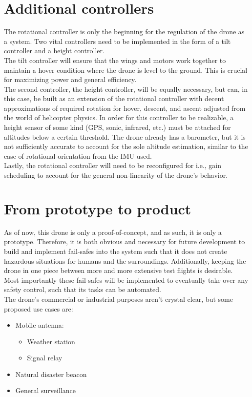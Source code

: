 \section{Additional controllers}
The rotational controller is only the beginning for the regulation of the drone as a system. Two vital controllers need to be implemented in the form of a tilt controller and a height controller. \\
The tilt controller will ensure that the wings and motors work together to maintain a hover condition where the drone is level to the ground. This is crucial for maximizing power and general efficiency.\\
The second controller, the height controller, will be equally necessary, but can, in this case, be built as an extension of the rotational controller with decent approximations of required rotation for hover, descent, and ascent adjusted from the world of helicopter physics. In order for this controller to be realizable, a height sensor of some kind (GPS, sonic, infrared, etc.) must be attached for altitudes below a certain threshold. The drone already has a barometer, but it is not sufficiently accurate to account for the sole altitude estimation, similar to the case of rotational orientation from the IMU used. \\
Lastly, the rotational controller will need to be reconfigured for i.e., gain scheduling to account for the general non-linearity of the drone's behavior. 

\section{From prototype to product}
As of now, this drone is only a proof-of-concept, and as such, it is only a prototype. Therefore, it is both obvious and necessary for future development to build and implement fail-safes into the system such that it does not create hazardous situations for humans and the surroundings. Additionally, keeping the drone in one piece between more and more extensive test flights is desirable. \\
Most importantly these fail-safes will be implemented to eventually take over any safety control, such that its tasks can be automated.\\
The drone's commercial or industrial purposes aren't crystal clear, but some proposed use cases are:
\begin{itemize}
    \item Mobile antenna:
    \begin{itemize}
        \item Weather station
        \item Signal relay
    \end{itemize}
    \item Natural disaster beacon
    \item General surveillance
\end{itemize}
